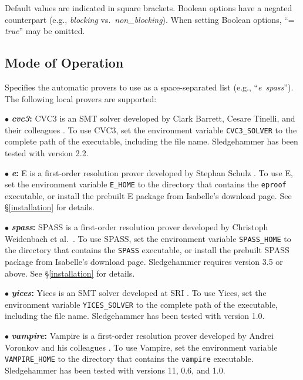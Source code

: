 \documentclass[a4paper,12pt]{article}
\begin{document}
Default values are indicated in square brackets. Boolean options have a negated
counterpart (e.g., \textit{blocking} vs.\ \textit{non\_blocking}). When setting
Boolean options, ``= \textit{true}'' may be omitted.

\subsection{Mode of Operation}
\label{mode-of-operation}

\begin{enum}
Specifies the automatic provers to use as a space-separated list (e.g.,
``\textit{e}~\textit{spass}''). The following local provers are supported:

\begin{enum}
\item[$\bullet$] \textbf{\textit{cvc3}:} CVC3 is an SMT solver developed by
Clark Barrett, Cesare Tinelli, and their colleagues \cite{cvc3}. To use CVC3,
set the environment variable \texttt{CVC3\_SOLVER} to the complete path of the
executable, including the file name. Sledgehammer has been tested with version
2.2.

\item[$\bullet$] \textbf{\textit{e}:} E is a first-order resolution prover
developed by Stephan Schulz \cite{schulz-2002}. To use E, set the environment
variable \texttt{E\_HOME} to the directory that contains the \texttt{eproof}
executable, or install the prebuilt E package from Isabelle's download page. See
\S\ref{installation} for details.

\item[$\bullet$] \textbf{\textit{spass}:} SPASS is a first-order resolution
prover developed by Christoph Weidenbach et al.\ \cite{weidenbach-et-al-2009}.
To use SPASS, set the environment variable \texttt{SPASS\_HOME} to the directory
that contains the \texttt{SPASS} executable, or install the prebuilt SPASS
package from Isabelle's download page. Sledgehammer requires version 3.5 or
above. See \S\ref{installation} for details.

\item[$\bullet$] \textbf{\textit{yices}:} Yices is an SMT solver developed at
SRI \cite{yices}. To use Yices, set the environment variable
\texttt{YICES\_SOLVER} to the complete path of the executable, including the
file name. Sledgehammer has been tested with version 1.0.

\item[$\bullet$] \textbf{\textit{vampire}:} Vampire is a first-order resolution
prover developed by Andrei Voronkov and his colleagues
\cite{riazanov-voronkov-2002}. To use Vampire, set the environment variable
\texttt{VAMPIRE\_HOME} to the directory that contains the \texttt{vampire}
executable. Sledgehammer has been tested with versions 11, 0.6, and 1.0.


\end{enum}
\end{enum}
\end{document}
